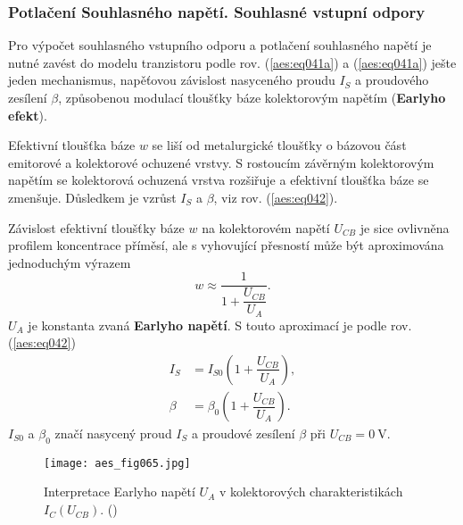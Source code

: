       \subsubsection{Potlačení Souhlasného napětí. Souhlasné vstupní
      odpory}\label{aesIchIIIsecIIIssecXII}
      
        Pro výpočet souhlasného vstupního odporu a potlačení souhlasného napětí je nutné zavést do
        modelu tranzistoru podle rov. (\ref{aes:eq041a}) a (\ref{aes:eq041a}) ješte jeden
        mechanismus, napěťovou závislost nasyceného proudu \(I_S\) a proudového zesílení \(\beta\),
        způsobenou modulací tloušťky báze kolektorovým napětím (\textbf{Earlyho efekt}).
        
        Efektivní tloušťka báze \(w\) se liší od metalurgické tloušťky o bázovou část emitorové a
        kolektorové ochuzené vrstvy. S rostoucím závěrným kolektorovým napětím se kolektorová
        ochuzená vrstva rozšiřuje a efektivní tloušťka báze se zmenšuje. Důsledkem je vzrůst \(I_S\)
        a \(\beta\), viz rov. (\ref{aes:eq042}).

        Závislost efektivní tloušťky báze \(w\) na kolektorovém napětí \(U_{CB}\) je sice ovlivněna
        profilem koncentrace příměsí, ale s vyhovující přesností může být aproximována jednoduchým
        výrazem
        \begin{equation}\label{aes:eq089}
          w \approx \dfrac{1}{1 + \dfrac{U_{CB}}{U_A}}.
        \end{equation}
        \(U_A\) je konstanta zvaná \textbf{Earlyho napětí}. S touto aproximací je podle rov.
        (\ref{aes:eq042})
        \begin{subequations}\label{aes:eq90}
          \begin{align}
            I_S   &= I_{S0}\left(1 + \dfrac{U_{CB}}{U_A}\right),           \label{aes:eq90a} \\
            \beta &= \beta_0\left(1 + \dfrac{U_{CB}}{U_A}\right).          \label{aes:eq90b} 
          \end{align}
        \end{subequations}
        \(I_{S0}\) a \(\beta_0\) značí nasycený proud \(I_S\) a proudové zesílení \(\beta\) při
        \(U_{CB} = \SI{0}{\V}\).

        \begin{figure}[ht!] %
          \centering
          \texttt{[image: aes\_fig065.jpg]}
          \caption{Interpretace Earlyho napětí \(U_A\) v kolektorových charakteristikách
                   \(I_C(U_{CB})\). (\cite[s.~54]{Dostal})}
          \label{aes:fig065}
        \end{figure}

